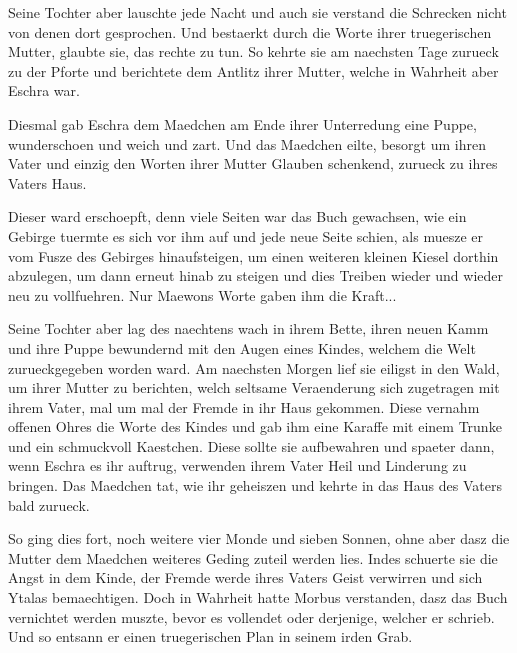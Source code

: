 \documentclass[a5paper,8pt]{book}
\begin{document}
Seine Tochter aber lauschte jede Nacht und auch sie verstand die Schrecken nicht von denen dort gesprochen. Und bestaerkt durch die Worte ihrer truegerischen Mutter, glaubte sie, das rechte zu tun. So kehrte sie am naechsten Tage zurueck zu der Pforte und berichtete dem Antlitz ihrer Mutter, welche in Wahrheit aber Eschra war.

Diesmal gab Eschra dem Maedchen am Ende ihrer Unterredung eine Puppe, wunderschoen und weich und zart. Und das Maedchen eilte, besorgt um ihren Vater und einzig den Worten ihrer Mutter Glauben schenkend, zurueck zu ihres Vaters Haus.

Dieser ward erschoepft, denn viele Seiten war das Buch gewachsen, wie ein Gebirge tuermte es sich vor ihm auf und jede neue Seite schien, als muesze er vom Fusze des Gebirges hinaufsteigen, um einen weiteren kleinen Kiesel dorthin abzulegen, um dann erneut hinab zu steigen und dies Treiben wieder und wieder neu zu vollfuehren. Nur Maewons Worte gaben ihm die Kraft...

Seine Tochter aber lag des naechtens wach in ihrem Bette, ihren neuen Kamm und ihre Puppe bewundernd mit den Augen eines Kindes, welchem die Welt zurueckgegeben worden ward. Am naechsten Morgen lief sie eiligst in den Wald, um ihrer Mutter zu berichten, welch seltsame Veraenderung sich zugetragen mit ihrem Vater, mal um mal der Fremde in ihr Haus gekommen. Diese vernahm offenen Ohres die Worte des Kindes und gab ihm eine Karaffe mit einem Trunke und ein schmuckvoll Kaestchen. Diese sollte sie aufbewahren und spaeter dann, wenn Eschra es ihr auftrug, verwenden ihrem Vater Heil und Linderung zu bringen. Das Maedchen tat, wie ihr geheiszen und kehrte in das Haus des Vaters bald zurueck.

So ging dies fort, noch weitere vier Monde und sieben Sonnen, ohne aber dasz die Mutter dem Maedchen weiteres Geding zuteil werden lies. Indes schuerte sie die Angst in dem Kinde, der Fremde werde ihres Vaters Geist verwirren und sich Ytalas bemaechtigen. Doch in Wahrheit hatte Morbus verstanden, dasz das Buch vernichtet werden muszte, bevor es vollendet oder derjenige, welcher er schrieb. Und so entsann er einen truegerischen Plan in seinem irden Grab.
\end{document}
